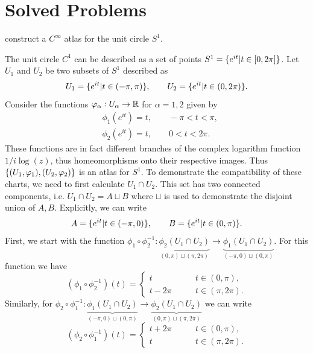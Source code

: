 \section{Solved Problems}


\begin{problem}
	construct a $ C^\infty $ atlas for the unit circle $ S^1 $. 
\end{problem}
\begin{solution}
	The unit circle $ C^1 $ can be described as a set of points $ S^1 =  \{e^{it}| t \in [0,2\pi]\} $. Let $ U_1 $ and $ U_2 $ be two subsets of $ S^1 $ described as
	\[ U_1 = \{e^{it}| t \in (-\pi,\pi)\},\qquad U_2 = \{e^{it}| t \in (0,2\pi)\}. \]
	Consider the functions $ \varphi_\alpha: U_\alpha \to \mathbb{R} $ for $ \alpha = 1,2 $ given by
	\begin{align*}
		&\phi_1(e^{it}) = t, \qquad -\pi<t<\pi,\\
		&\phi_2(e^{it}) = t, \qquad 0<t<2\pi.
	\end{align*}
	These functions are in fact different branches of the complex logarithm function $ 1/i\log(z) $, thus homeomorphisms onto their respective images. Thus $ \{(U_1,\varphi_1),(U_2,\varphi_2)\} $ is an atlas for $ S^1 $. To demonstrate the compatibility of these charts, we need to first calculate $ U_1 \cap U_2 $. This set has two connected components, i.e. $ U_1 \cap U_2 = A \sqcup B $ where $ \sqcup $ is used to demonstrate the disjoint union of $ A,B $. Explicitly, we can write
	\[ A = \{e^{it}| t \in (-\pi,0)\}, \qquad B = \{e^{it}| t\in(0,\pi)\}. \]
	First, we start with the function $ \phi_1 \circ \phi_2^{-1}: \underbrace{\phi_2(U_1\cap U_2)}_{(0,\pi)\sqcup (\pi,2\pi)} \to \underbrace{\phi_1(U_1\cap U_2)}_{(-\pi,0)\sqcup (0,\pi)} $. For this function we have
	\[ (\phi_1\circ\phi_2^{-1})(t) = \begin{cases}
		t \qquad &t\in(0,\pi),\\
		t - 2\pi \qquad &t\in(\pi,2\pi).
	\end{cases} \]
	Similarly, for $ \phi_2 \circ \phi_1^{-1}: \underbrace{\phi_1(U_1\cap U_2)}_{(-\pi,0)\sqcup (0,\pi)} \to \underbrace{\phi_2(U_1\cap U_2)}_{(0,\pi)\sqcup (\pi,2\pi)} $ we can write
	\[ (\phi_2\circ\phi_1^{-1})(t) = \begin{cases}
		t+2\pi \qquad &t\in(0,\pi),\\
		t \qquad &t\in(\pi,2\pi).
	\end{cases} \]
	
	
\end{solution}

